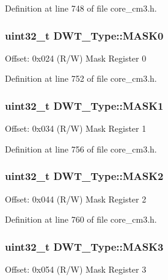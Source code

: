 Definition at line 748 of file core\+\_\+cm3.\+h.

\subsubsection[{\texorpdfstring{M\+A\+S\+K0}{MASK0}}]{ uint32\+\_\+t D\+W\+T\+\_\+\+Type\+::\+M\+A\+S\+K0}\hypertarget{structDWT__Type_a5bb1c17fc754180cc197b874d3d8673f}{}\label{structDWT__Type_a5bb1c17fc754180cc197b874d3d8673f}
Offset\+: 0x024 (R/W) Mask Register 0 

Definition at line 752 of file core\+\_\+cm3.\+h.

\subsubsection[{\texorpdfstring{M\+A\+S\+K1}{MASK1}}]{ uint32\+\_\+t D\+W\+T\+\_\+\+Type\+::\+M\+A\+S\+K1}\hypertarget{structDWT__Type_a0c684438a24f8c927e6e01c0e0a605ef}{}\label{structDWT__Type_a0c684438a24f8c927e6e01c0e0a605ef}
Offset\+: 0x034 (R/W) Mask Register 1 

Definition at line 756 of file core\+\_\+cm3.\+h.

\subsubsection[{\texorpdfstring{M\+A\+S\+K2}{MASK2}}]{ uint32\+\_\+t D\+W\+T\+\_\+\+Type\+::\+M\+A\+S\+K2}\hypertarget{structDWT__Type_a8ecdc8f0d917dac86b0373532a1c0e2e}{}\label{structDWT__Type_a8ecdc8f0d917dac86b0373532a1c0e2e}
Offset\+: 0x044 (R/W) Mask Register 2 

Definition at line 760 of file core\+\_\+cm3.\+h.

\subsubsection[{\texorpdfstring{M\+A\+S\+K3}{MASK3}}]{ uint32\+\_\+t D\+W\+T\+\_\+\+Type\+::\+M\+A\+S\+K3}\hypertarget{structDWT__Type_ae3f01137a8d28c905ddefe7333547fba}{}\label{structDWT__Type_ae3f01137a8d28c905ddefe7333547fba}
Offset\+: 0x054 (R/W) Mask Register 3 

